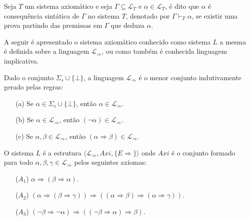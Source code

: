 \begin{definition}\label{def:ConsequenciaAxiomatica}
    Seja $T$ um sistema axiomático e seja $\Gamma \subseteq \mathcal{L}_T$ e $\alpha \in \mathcal{L}_T$, é dito que $\alpha$ é consequência sintática de $\Gamma$ no sistema $T$, denotado por $\Gamma \vdash_T \alpha$, se existir uma prova partindo das premissas em $\Gamma$ que deduza $\alpha$.
\end{definition}

A seguir é apresentado o sistema axiomático conhecido como sistema $L$ a mesma é definida sobre a linguagem $\mathcal{L}_\Rightarrow$, ou como também é conhecida linguagem implicativa.

\begin{definition}\label{def:LinguagemL}
    Dado o conjunto $\Sigma_s \cup \{\bot\}$, a linguagem $\mathcal{L}_\Rightarrow$ é o menor conjunto indutivamente gerado pelas regras:
    \begin{itemize}
        \item[(a)] Se $\alpha \in \Sigma_s \cup \{\bot\}$, então $\alpha \in \mathcal{L}_\Rightarrow$.
        \item[(b)] Se $\alpha \in \mathcal{L}_\Rightarrow$, então $(\neg \alpha) \in \mathcal{L}_\Rightarrow$.
        \item[(c)] Se $\alpha, \beta \in \mathcal{L}_\Rightarrow$, então $(\alpha \Rightarrow \beta) \in \mathcal{L}_\Rightarrow$.
    \end{itemize}
\end{definition}

\begin{definition}[Sistema $L$]\label{def:SistemaL}
   \cite{mendelson2009livro} O sistema $L$ é a  estrutura $\langle \mathcal{L}_\Rightarrow, Axi, \{ E\Rightarrow\}\rangle$ onde $Axi$ é o conjunto formado para todo $\alpha, \beta, \gamma \in \mathcal{L}_\Rightarrow$ pelos seguintes axiomas:
\end{definition}

\begin{itemize}
    \item[($A_1$)] $\alpha \Rightarrow (\beta \Rightarrow \alpha)$.
    \item[($A_2$)] $(\alpha \Rightarrow (\beta \Rightarrow \gamma)) \Rightarrow ((\alpha \Rightarrow \beta) \Rightarrow (\alpha \Rightarrow \gamma))$.
    \item[($A_3$)] $(\neg \beta \Rightarrow \neg \alpha) \Rightarrow ((\neg \beta \Rightarrow \alpha) \Rightarrow \beta)$.
\end{itemize}


